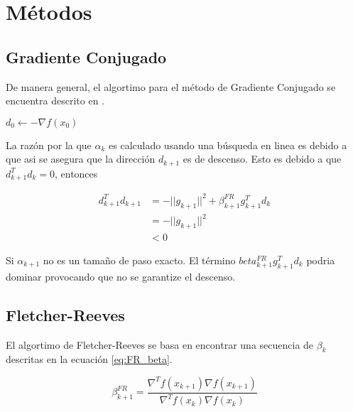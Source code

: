\section{Métodos}

\subsection{Gradiente Conjugado}

De manera general, el algortimo para el método de Gradiente Conjugado se encuentra descrito en .

\begin{algorithm}[H]
    $d_0 \gets -\nabla f(x_0)$\\
\end{algorithm}

La razón por la que $\alpha_k$ es calculado usando una búsqueda en linea es debido a que asi se asegura que la dirección $d_{k+1}$ es de descenso. Esto es debido a que $d_{k+1}^Td_k=0$, entonces

\begin{align*}
    d_{k+1}^Td_{k+1} & = - ||g_{k+1}||^2+\beta_{k+1}^{FR}g_{k+1}^Td_k \\
                     & = -||g_{k+1}||^2                               \\
                     & <0
\end{align*}

Si $\alpha_{k+1}$ no es un tamaño de paso exacto. El término $beta_{k+1}^{FR}g_{k+1}^Td_k $ podria dominar provocando que no se garantize el descenso.

\subsection{Fletcher-Reeves}

El algortimo de Fletcher-Reeves\cite{fletcher_1964} se basa en encontrar una secuencia de $\beta_k$ descritas en la ecuación \ref{eq:FR_beta}.

\begin{equation}
    \beta_{k+1}^{FR} = \frac{\nabla^T f(x_{k+1})\nabla f(x_{k+1})}{\nabla^T f(x_{k})\nabla f(x_{k})} \label{eq:FR_beta}
\end{equation}

